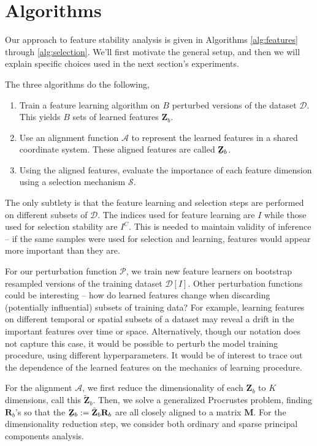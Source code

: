 
\section{Algorithms}
\label{sec:algorithms}

Our approach to feature stability analysis is given in Algorithms
\ref{alg:features} through \ref{alg:selection}. We'll first motivate the general
setup, and then we will explain specific choices used in the next section's
experiments.

The three algorithms do the following,
\begin{enumerate}
  \item Train a feature learning algorithm on $B$ perturbed versions of the
    dataset $\mathcal{D}$. This yields $B$ sets of learned features
    $\mathbf{Z}_{b}$.
  \item Use an alignment function $\mathcal{A}$ to represent the learned
    features in a shared coordinate system. These aligned features are called
    $\underaccent{\bar}{\mathbf{Z}}_{b}$.
  \item Using the aligned features, evaluate the importance of each feature
    dimension using a selection mechanism $\mathcal{S}$.
\end{enumerate}

The only subtlety is that the feature learning and selection steps are performed
on different subsets of $\mathcal{D}$. The indices used for feature learning are
$I$ while those used for selection stability are $I^{C}$. This is needed to
maintain validity of inference -- if the same samples were used for selection
and learning, features would appear more important than they are.

For our perturbation function $\mathcal{P}$, we train new feature learners on
bootstrap resampled versions of the training dataset
$\mathcal{D}\left[I\right]$. Other perturbation functions could be interesting
-- how do learned features change when discarding (potentially influential)
subsets of training data? For example, learning features on different temporal
or spatial subsets of a dataset may reveal a drift in the important features
over time or space. Alternatively, though our notation does not capture this
case, it would be possible to perturb the model training procedure, using
different hyperparameters. It would be of interest to trace out the dependence
of the learned features on the mechanics of learning procedure.

For the alignment $\mathcal{A}$, we first reduce the dimensionality of each
$\mathbf{Z}_{b}$ to $K$ dimensions, call this $\tilde{\mathbf{Z}}_{b}$. Then, we
solve a generalized Procrustes problem, finding $\mathbf{R}_{b}$'s so that the
$\underaccent{\bar}{\mathbf{Z}}_{b} := \tilde{\mathbf{Z}}_{b}\mathbf{R}_{b}$ are
all closely aligned to a matrix $\mathbf{M}$. For the dimensionality reduction
step, we consider both ordinary and sparse principal components analysis.

